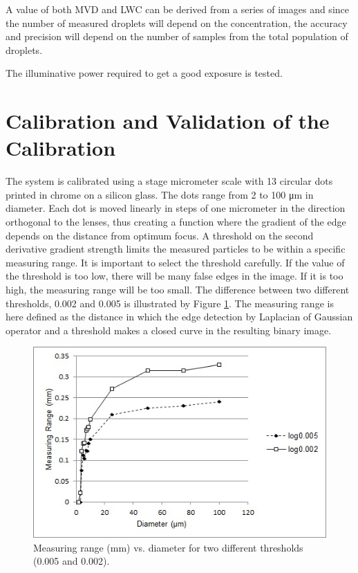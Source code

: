 A value of both MVD and LWC can be derived from a series of images and since the number of measured droplets will depend on the concentration, the accuracy and precision will depend on the number of samples from the total population of droplets. 

The illuminative power required to get a good exposure is tested.

\section{Calibration and Validation of the Calibration}

The system is calibrated using a stage micrometer scale with 13 circular dots printed in chrome on a silicon glass. The dots range from 2 to 100 μm in diameter. Each dot is moved linearly in steps of one micrometer in the direction orthogonal to the lenses, thus creating a function where the gradient of the edge depends on the distance from optimum focus. A threshold on the second derivative gradient strength limits the measured particles to be within a specific measuring range. It is important to select the threshold carefully. If the value of the threshold is too low, there will be many false edges in the image. If it is too high, the measuring range will be too small. The difference between two different thresholds, 0.002 and 0.005 is illustrated by Figure \ref{fig:measrangevslogth}.  The measuring range is here defined as the distance in which the edge detection by Laplacian of Gaussian operator and a threshold makes a closed curve in the resulting binary image.

\begin{figure}[ht]
\centering\includegraphics[width=0.75\linewidth]{figures/meas_range_vs_log_th}
\caption{Measuring range (mm) vs. diameter for two different thresholds (0.005 and 0.002).}
\label{fig:measrangevslogth}
\end{figure}

